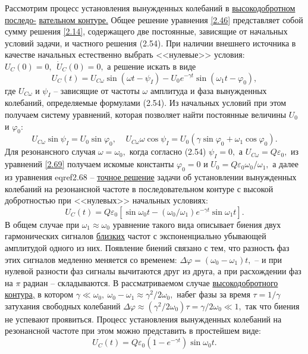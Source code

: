 {Рассмотрим процесс установления вынужденных колебаний в \underline{вы\-со\-ко\-доб\-рот\-ном пос\-ле\-до-} \underline{ва\-тель\-ном контуре.} Общее решение уравнения \eqref{2.46} представляет собой сумму решения \eqref{2.14}, содержащего две постоянные, зависящие от начальных условий задачи, и частного решения (2.54). При наличии внешнего источника в качестве начальных естественно выбрать <<нулевые>> условия: $U_C(0)=0,~~\dot U_C(0)=0,$ а решение искать в виде
\begin{equation}\label{2.68}
U_C(t)=U_{C\omega}\sin(\omega t-\psi_I)-U_0e^{-\gamma t}\sin(\omega_1t-\varphi_0),
\end{equation}
где $U_{C\omega}$ и $\psi_I$ – зависящие от частоты $\omega$ амплитуда и фаза вынужденных колебаний, опреде\-ляемые формулами (2.54). Из начальных условий при этом получаем систему уравнений, кото\-рая позволяет найти постоянные величины $U_0$ и $\varphi_0:$
\begin{equation}\label{2.69}
U_{C\omega}\sin\psi_I=U_0\sin\varphi_0,~~~~~U_{C\omega}\omega\cos\psi_I=U_0(\gamma\sin\varphi_0+\omega_1\cos\varphi_0).
\end{equation}
Для резонансного случая $\omega=\omega_0,$ когда согласно (2.54) $\psi_I=0,$ а $U_{C\omega}=Q\varepsilon_0,$ из уравнений \eqref{2.69} получаем искомые константы $\varphi_0=0$ и $U_0=Q\varepsilon_0\omega_0/\omega_1,$ а далее из уравнения eqref{2.68} – \underline{точное решение} задачи об установлении вынужденных колебаний на резонансной частоте в последовательном контуре с высокой добротностью при <<нулевых>> начальных условиях:
\begin{equation}\label{2.70}
U_{C}(t)=Q\varepsilon_0[\sin\omega_0t-(\omega_0/\omega_1)e^{-\gamma t}\sin\omega_1 t].
\end{equation}
В общем случае при $\omega_1\approx\omega_0$ уравнение такого вида описывает \textsf{биения} двух гармонических сигналов \underline{близких} частот с экспоненциально убывающей амплитудой одного из них. Появление биений связано с тем, что разность фаз этих сигналов медленно меняется со временем: $\Delta\varphi=(\omega_0-\omega_1)t,$ – и при нулевой разности фаз сигналы вычитаются друг из друга, а при расхождении фаз на $\pi$ радиан – складываются. В рассматриваемом случае \underline{высокодобротного контура,} в котором $\gamma\ll\omega_0,~\omega_0-\omega_1\approx\gamma^2/2\omega_0,$ набег фазы за время $\tau=1/\gamma$ затухания свободных колебаний $\Delta\varphi\approx(\gamma^2/2\omega_0)\tau=\gamma/2\omega_0\ll1,$  так что биения не успевают проявиться. Процесс установления вынужденных колебаний на резонансной частоте при этом можно представить в простейшем виде:
\begin{equation}\label{2.71}
U_C(t)=Q\varepsilon_0(1-e^{-\gamma t})\sin\omega_0 t.
\end{equation}

}
